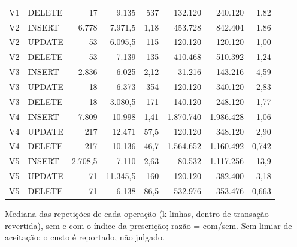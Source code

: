{\begin{tabular}{llrrrrrr}
V1 & DELETE & 17 & 9.135 & 537 & 132.120 & 240.120 & 1,82 \\
V2 & INSERT & 6.778 & 7.971,5 & 1,18 & 453.728 & 842.404 & 1,86 \\
V2 & UPDATE & 53 & 6.095,5 & 115 & 120.120 & 120.120 & 1,00 \\
V2 & DELETE & 53 & 7.139 & 135 & 410.468 & 510.392 & 1,24 \\
V3 & INSERT & 2.836 & 6.025 & 2,12 & 31.216 & 143.216 & 4,59 \\
V3 & UPDATE & 18 & 6.373 & 354 & 120.120 & 340.120 & 2,83 \\
V3 & DELETE & 18 & 3.080,5 & 171 & 140.120 & 248.120 & 1,77 \\
V4 & INSERT & 7.809 & 10.998 & 1,41 & 1.870.740 & 1.986.428 & 1,06 \\
V4 & UPDATE & 217 & 12.471 & 57,5 & 120.120 & 348.120 & 2,90 \\
V4 & DELETE & 217 & 10.136 & 46,7 & 1.564.652 & 1.160.492 & 0,742 \\
V5 & INSERT & 2.708,5 & 7.110 & 2,63 & 80.532 & 1.117.256 & 13,9 \\
V5 & UPDATE & 71 & 11.345,5 & 160 & 120.120 & 382.400 & 3,18 \\
V5 & DELETE & 71 & 6.138 & 86,5 & 532.976 & 353.476 & 0,663 \\
\bottomrule
\end{tabular}\par
\vspace{3pt}
\begin{minipage}{\linewidth}\footnotesize
Mediana das repetições de cada operação (k linhas, dentro de transação revertida), sem e com o índice da prescrição; razão = com/sem. Sem limiar de aceitação: o custo é reportado, não julgado.
\end{minipage}
}
